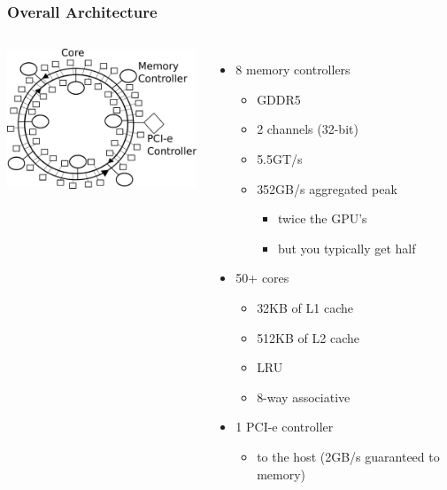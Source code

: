 \documentclass{beamer}
\begin{document}
\begin{frame}
  \frametitle{Overall Architecture}
  \begin{columns}
    \column{18em}    
    \includegraphics[width=18em]{slides-figures/MIC-overview.pdf}
    \column{17em}
    
    \begin{itemize}
      \item 8 memory controllers
        \begin{itemize}
          \item GDDR5
          \item 2 channels (32-bit)
          \item 5.5GT/s
          \item 352GB/s aggregated peak
            \begin{itemize}
              \item twice the GPU's
              \item but you typically get half
            \end{itemize}
        \end{itemize}
      \item 50+ cores
        \begin{itemize}
          \item 32KB of L1 cache
          \item 512KB of L2 cache
          \item LRU
          \item 8-way associative
        \end{itemize}
      \item 1 PCI-e controller
        \begin{itemize}
          \item to the host (2GB/s guaranteed to memory)
        \end{itemize}
    \end{itemize}
  \end{columns}

\end{frame}
\end{document}
